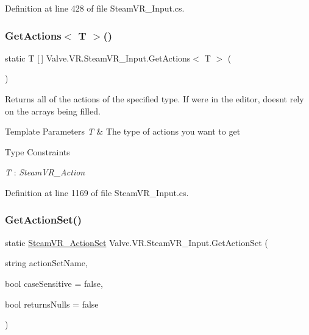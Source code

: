 Definition at line 428 of file Steam\+V\+R\+\_\+\+Input.\+cs.

\mbox{\label{class_valve_1_1_v_r_1_1_steam_v_r___input_a7a089fd07a7a18392f2e6b263a77ec96}} 
\subsubsection{\texorpdfstring{GetActions$<$ T $>$()}{GetActions< T >()}}
{\footnotesize\ttfamily static T \mbox{[}$\,$\mbox{]} Valve.\+V\+R.\+Steam\+V\+R\+\_\+\+Input.\+Get\+Actions$<$ T $>$ (\begin{DoxyParamCaption}{ }\end{DoxyParamCaption})\hspace{0.3cm}{\ttfamily [static]}}



Returns all of the actions of the specified type. If we\textquotesingle{}re in the editor, doesn\textquotesingle{}t rely on the arrays being filled. 


\begin{DoxyTemplParams}{Template Parameters}
{\em T} & The type of actions you want to get\\
\hline
\end{DoxyTemplParams}
\begin{Desc}
\item[Type Constraints]\begin{description}
\item[{\em T} : {\em Steam\+V\+R\+\_\+\+Action}]\end{description}
\end{Desc}


Definition at line 1169 of file Steam\+V\+R\+\_\+\+Input.\+cs.

\mbox{\label{class_valve_1_1_v_r_1_1_steam_v_r___input_a645e9f34de97217c31c20ba913c8d3e6}} 
\subsubsection{\texorpdfstring{GetActionSet()}{GetActionSet()}}
{\footnotesize\ttfamily static \mbox{\hyperlink{class_valve_1_1_v_r_1_1_steam_v_r___action_set}{Steam\+V\+R\+\_\+\+Action\+Set}} Valve.\+V\+R.\+Steam\+V\+R\+\_\+\+Input.\+Get\+Action\+Set (\begin{DoxyParamCaption}\item[{string}]{action\+Set\+Name,  }\item[{bool}]{case\+Sensitive = {\ttfamily false},  }\item[{bool}]{returns\+Nulls = {\ttfamily false} }\end{DoxyParamCaption})\hspace{0.3cm}{\ttfamily [static]}}



